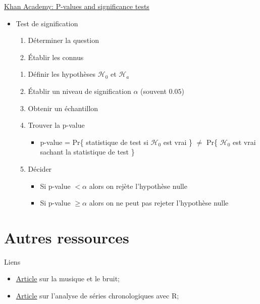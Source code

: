 \documentclass[12pt, titlepage, french]{report}
\begin{document}
\begin{YTB_SUMM}{\href{https://www.youtube.com/watch?v=KS6KEWaoOOE}{Khan Academy: P-values and significance tests}}
\begin{itemize}
	\item	Test de signification
	\begin{enumerate}[label=\roman*]
		\item	Déterminer la question
		\item	Établir les connus
	\end{enumerate}
	\begin{enumerate}
		\item	Définir les hypothèses $\mathcal{H}_{0}$ et $\mathcal{H}_{a}$
		\item	Établir un niveau de signification $\alpha$ (souvent $0.05$)
		\item	Obtenir un échantillon
		\item	Trouver la p-value
		\begin{itemize}
			\item	p-value = Pr\{ statistique de test si $\mathcal{H}_{0}$ est vrai \} $\neq$  Pr\{ $\mathcal{H}_{0}$ est vrai sachant la statistique de test \}
		\end{itemize}
		\item	Décider
		\begin{itemize}
			\item	Si p-value $< \alpha$  alors on rejète l'hypothèse nulle
			\item	Si p-value $\geq \alpha$ alors on ne peut pas rejeter l'hypothèse nulle
		\end{itemize}
	\end{enumerate}
\end{itemize}
\end{YTB_SUMM}

\clearpage

\section{Autres ressources}
\begin{FORMULA_SUMM}{Liens}
\begin{itemize}
	\item	\href{https://physics.info/music/}{Article} sur la musique et le bruit;
	\item	\href{https://www.quantstart.com/articles/White-Noise-and-Random-Walks-in-Time-Series-Analysis/}{Article} sur l'analyse de séries chronologiques avec \textsc{R};
\end{itemize}
\end{FORMULA_SUMM}
\end{document}
